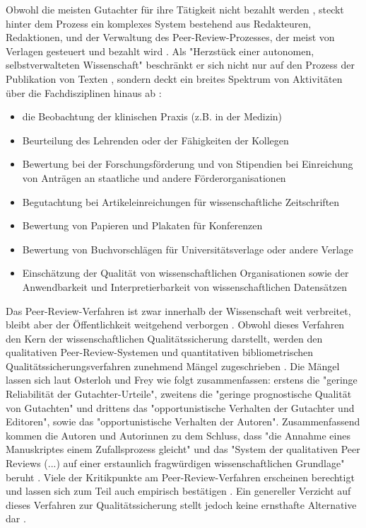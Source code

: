 Obwohl die meisten Gutachter für ihre Tätigkeit nicht bezahlt werden \cite{Yiotis_2005}, steckt hinter dem Prozess ein komplexes System bestehend aus Redakteuren, Redaktionen, und der Verwaltung des Peer-Review-Prozesses, der meist von Verlagen gesteuert und bezahlt wird \cite{Bargheer_2015} \cite{Mueller_2009} \cite{Baggs_2006}. Als "Herzstück einer autonomen, selbstverwalteten Wissenschaft" \cite[:5]{Neidhardt_2006} beschränkt er sich nicht nur auf den Prozess der Publikation von Texten \cite{Mueller_2009}, sondern deckt ein breites Spektrum von Aktivitäten über die Fachdisziplinen hinaus ab \cite{Lee_2012}:
\begin{itemize}
\item die Beobachtung der klinischen Praxis (z.B. in der Medizin)
\item Beurteilung des Lehrenden oder der Fähigkeiten der Kollegen
\item Bewertung bei der Forschungsförderung und von Stipendien bei Einreichung von Anträgen an staatliche und andere Förderorganisationen
\item Begutachtung bei Artikeleinreichungen für wissenschaftliche Zeitschriften
\item Bewertung von Papieren und Plakaten für Konferenzen
\item Bewertung von Buchvorschlägen für Universitätsverlage oder andere Verlage
\item Einschätzung der Qualität von wissenschaftlichen Organisationen sowie der Anwendbarkeit und Interpretierbarkeit von wissenschaftlichen Datensätzen
\end{itemize}

Das Peer-Review-Verfahren ist zwar innerhalb der Wissenschaft weit verbreitet, bleibt aber der Öffentlichkeit weitgehend verborgen \cite{Konneker_2013}. Obwohl dieses Verfahren den Kern der wissenschaftlichen Qualitätssicherung darstellt, werden den qualitativen Peer-Review-Systemen und quantitativen bibliometrischen Qualitätssicherungsverfahren zunehmend Mängel zugeschrieben \cite{Peters_2014} \cite{Lee_2012} \cite{Bar_2009} \cite{Osterloh_2008} \cite{Ware_2008} \cite{Smith_2006} \cite{Jansen_2007} \cite{Smith_1999b}. Die Mängel lassen sich laut Osterloh und Frey wie folgt zusammenfassen: erstens die "geringe Reliabilität der Gutachter-Urteile", zweitens die "geringe prognostische Qualität von Gutachten" und drittens das "opportunistische Verhalten der Gutachter und Editoren", sowie das "opportunistische Verhalten der Autoren". Zusammenfassend kommen die Autoren und Autorinnen zu dem Schluss, dass "die Annahme eines Manuskriptes einem Zufallsprozess gleicht" und das "System der qualitativen Peer Reviews (...) auf einer erstaunlich fragwürdigen wissenschaftlichen Grundlage" beruht \cite{Osterloh_2008}. Viele der Kritikpunkte am Peer-Review-Verfahren erscheinen berechtigt und lassen sich zum Teil auch empirisch bestätigen \cite{Mueller_2009}. Ein genereller Verzicht auf dieses Verfahren zur Qualitätssicherung stellt jedoch keine ernsthafte Alternative dar \cite{Smith_2006}.

